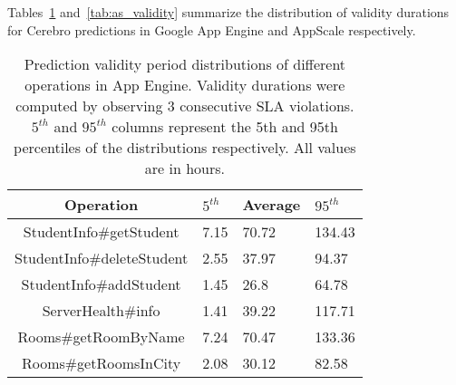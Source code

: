 

Tables~\ref{tab:gae_validity} and~\ref{tab:as_validity} summarize 
the distribution of validity 
durations for Cerebro predictions in Google App Engine and AppScale
respectively.

\begin{table}[htdp]
\caption{Prediction validity period distributions of different operations in
App Engine. Validity durations were computed by observing $3$ consecutive SLA
violations. $5^{th}$ and $95^{th}$ columns represent the 5th and 95th 
percentiles of the
distributions respectively. All values are in hours.}
\begin{center}
\begin{tabular}{|c|p{1cm}|p{1cm}|p{1cm}|}
\hline
Operation & $5^{th}$ & Average & $95^{th}$ \\ \hline
StudentInfo\#getStudent & 7.15 & 70.72 & 134.43 \\ \hline
StudentInfo\#deleteStudent & 2.55 & 37.97 & 94.37 \\ \hline
StudentInfo\#addStudent & 1.45 & 26.8 & 64.78 \\ \hline
ServerHealth\#info & 1.41 & 39.22 & 117.71 \\ \hline
Rooms\#getRoomByName & 7.24 & 70.47 & 133.36 \\ \hline
Rooms\#getRoomsInCity & 2.08 & 30.12 & 82.58 \\ \hline
\end{tabular}
\end{center}
\label{tab:gae_validity}
\end{table}

